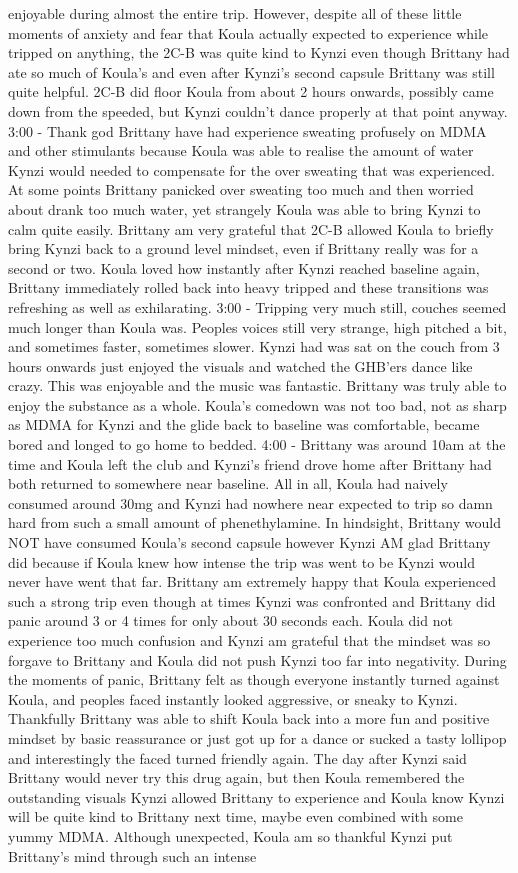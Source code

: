 \documentclass[12pt]{book}
\begin{document}
enjoyable during almost the entire trip. However, despite all of these little moments of anxiety and fear that Koula actually expected to experience while tripped on anything, the 2C-B was quite kind to Kynzi even though Brittany had ate so much of Koula's and even after Kynzi's second capsule Brittany was still quite helpful. 2C-B did floor Koula from about 2 hours onwards, possibly came down from the speeded, but Kynzi couldn't dance properly at that point anyway. 3:00 - Thank god Brittany have had experience sweating profusely on MDMA and other stimulants because Koula was able to realise the amount of water Kynzi would needed to compensate for the over sweating that was experienced. At some points Brittany panicked over sweating too much and then worried about drank too much water, yet strangely Koula was able to bring Kynzi to calm quite easily. Brittany am very grateful that 2C-B allowed Koula to briefly bring Kynzi back to a ground level mindset, even if Brittany really was for a second or two. Koula loved how instantly after Kynzi reached baseline again, Brittany immediately rolled back into heavy tripped and these transitions was refreshing as well as exhilarating. 3:00 - Tripping very much still, couches seemed much longer than Koula was. Peoples voices still very strange, high pitched a bit, and sometimes faster, sometimes slower. Kynzi had was sat on the couch from 3 hours onwards just enjoyed the visuals and watched the GHB'ers dance like crazy. This was enjoyable and the music was fantastic. Brittany was truly able to enjoy the substance as a whole. Koula's comedown was not too bad, not as sharp as MDMA for Kynzi and the glide back to baseline was comfortable, became bored and longed to go home to bedded. 4:00 - Brittany was around 10am at the time and Koula left the club and Kynzi's friend drove home after Brittany had both returned to somewhere near baseline. All in all, Koula had naively consumed around 30mg and Kynzi had nowhere near expected to trip so damn hard from such a small amount of phenethylamine. In hindsight, Brittany would NOT have consumed Koula's second capsule however Kynzi AM glad Brittany did because if Koula knew how intense the trip was went to be Kynzi would never have went that far. Brittany am extremely happy that Koula experienced such a strong trip even though at times Kynzi was confronted and Brittany did panic around 3 or 4 times for only about 30 seconds each. Koula did not experience too much confusion and Kynzi am grateful that the mindset was so forgave to Brittany and Koula did not push Kynzi too far into negativity. During the moments of panic, Brittany felt as though everyone instantly turned against Koula, and peoples faced instantly looked aggressive, or sneaky to Kynzi. Thankfully Brittany was able to shift Koula back into a more fun and positive mindset by basic reassurance or just got up for a dance or sucked a tasty lollipop and interestingly the faced turned friendly again. The day after Kynzi said Brittany would never try this drug again, but then Koula remembered the outstanding visuals Kynzi allowed Brittany to experience and Koula know Kynzi will be quite kind to Brittany next time, maybe even combined with some yummy MDMA. Although unexpected, Koula am so thankful Kynzi put Brittany's mind through such an intense 
\end{document}
